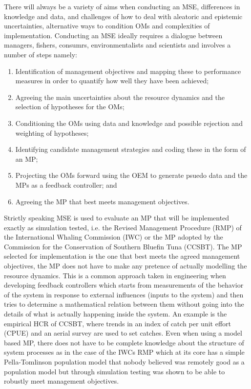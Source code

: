 \documentclass[%
nonumbib,      %
%
]{nrc1}                          %
\begin{document}
There will always be a variety of aims when conducting an MSE, differences in knowledge and data, and challenges of how to deal with aleatoric and epistemic uncertainties, alternative ways to condition OMs and complexities of implementation. Conducting an MSE ideally requires a dialogue between managers, fishers, consumrs, environmentalists and scientists and involves a number of steps \citep{punt2007developing} namely:

\begin{enumerate}
 \item Identification of management objectives and mapping these to performance measures in order to quantify how well they have been achieved;
 \item Agreeing the main uncertainties about the resource dynamics and the selection of hypotheses for the OMs;
 \item Conditioning the OMs using data and knowledge and possible rejection and weighting of hypotheses;
 \item Identifying candidate management strategies and coding these in the form of an MP;
 \item Projecting the OMs forward using the OEM to generate psuedo data and the MPs as a feedback controller; and
 \item Agreeing the MP that best meets management objectives.
\end{enumerate}

Strictly speaking MSE is used to evaluate an MP that will be implemented exactly as simulation tested, i.e. the Revised Management Procedure (RMP) of the International Whaling Commission (IWC) or the MP adopted by the Commission for the Conservation of Southern Bluefin Tuna (CCSBT). The MP selected for implementation is the one that best meets the agreed management objectives, the MP does not have to make any pretence of actually modelling the resource dynamics. This is a common approach taken in engineering when developing feedback controllers which starts from measurements of the behavior of the system in response to external influences (inputs to the system) and then tries to determine a mathematical relation between them without going into the details of what is actually happening inside the system. An example is the empirical HCR of CCSBT, where trends in an index of catch per unit effort (CPUE) and an aerial survey are used to set catches. Even when using a model based MP, there does not have to be complete knowledge about the structure of system processes \cite{sohlberg2012supervision} as in the case of the IWCs RMP which at its core has a simple Pella-Tomlinson population model that nobody believed was remotely good as a population model but through simulation testing was shown to be able to robustly meet management objectives.
\end{document}
